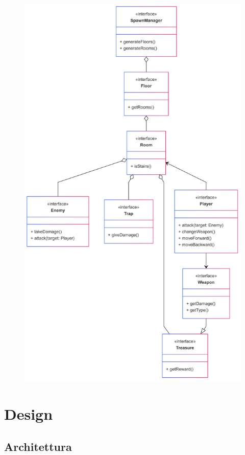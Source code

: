 \documentclass[a4paper,12pt]{report}
\begin{document}
\begin{figure}[H]
	\includegraphics[scale=0.15]{img/analisys.png}
\end{figure}

\chapter{Design}

\section{Architettura}
\end{document}
